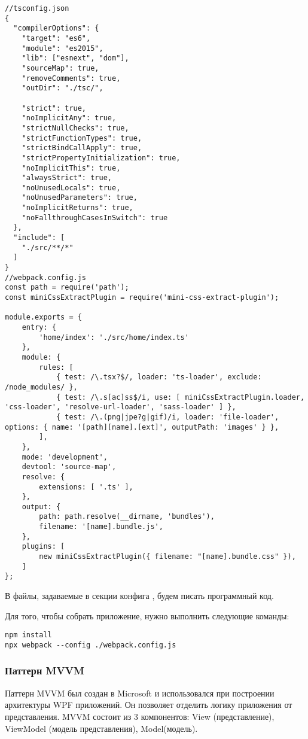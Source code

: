 \documentclass[a4paper,14pt]{extarticle}
\begin{document}
\begin{lstlisting}
//tsconfig.json
{
  "compilerOptions": {
    "target": "es6",
    "module": "es2015",
    "lib": ["esnext", "dom"],
    "sourceMap": true,
    "removeComments": true,
    "outDir": "./tsc/",

    "strict": true,
    "noImplicitAny": true,
    "strictNullChecks": true,
    "strictFunctionTypes": true,
    "strictBindCallApply": true,
    "strictPropertyInitialization": true,
    "noImplicitThis": true,
    "alwaysStrict": true,
    "noUnusedLocals": true,
    "noUnusedParameters": true,
    "noImplicitReturns": true,
    "noFallthroughCasesInSwitch": true
  },
  "include": [
    "./src/**/*"
  ]
}
//webpack.config.js
const path = require('path');
const miniCssExtractPlugin = require('mini-css-extract-plugin');

module.exports = {
    entry: {
        'home/index': './src/home/index.ts'
    },
    module: {
        rules: [
            { test: /\.tsx?$/, loader: 'ts-loader', exclude: /node_modules/ },
            { test: /\.s[ac]ss$/i, use: [ miniCssExtractPlugin.loader, 'css-loader', 'resolve-url-loader', 'sass-loader' ] },
            { test: /\.(png|jpe?g|gif)/i, loader: 'file-loader', options: { name: '[path][name].[ext]', outputPath: 'images' } },
        ],
    },
    mode: 'development',
    devtool: 'source-map',
    resolve: {
        extensions: [ '.ts' ],
    },
    output: {
        path: path.resolve(__dirname, 'bundles'),
        filename: '[name].bundle.js',
    },
    plugins: [
        new miniCssExtractPlugin({ filename: "[name].bundle.css" }),
    ]
};
\end{lstlisting}

В файлы, задаваемые в секции  конфига , будем писать
программный код.

Для того, чтобы собрать приложение, нужно выполнить следующие команды:

\begin{lstlisting}
npm install
npx webpack --config ./webpack.config.js
\end{lstlisting}

\subsubsection{Паттерн MVVM}

Паттерн MVVM был создан в Microsoft и использовался при построении архитектуры
WPF приложений. Он позволяет отделить логику приложения от представления. MVVM
состоит из 3 компонентов: View (представление), ViewModel (модель
представления), Model(модель).
\end{document}
